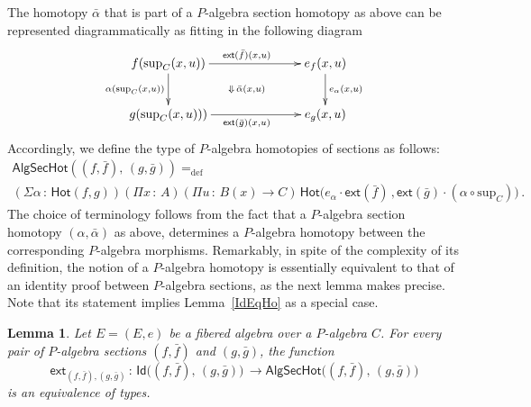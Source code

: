\documentclass[10pt,a4paper,oneside,reqno]{amsart}
\numberwithin{equation}{section}
\theoremstyle{mythm}
\newtheorem{lemma}[theorem]{Lemma}
\theoremstyle{mydef}
\theoremstyle{myrmk}
\newcommand{\defeq}{=_{\mathrm{def}}}
\newcommand{\co}{\,{:}\,}
\newcommand{\ct}{\cdot}
\newcommand{\Hot}{\mathsf{Hot}}
\newcommand{\ext}{\mathsf{ext}}
\newcommand{\Id}{\mathsf{Id}}
\renewcommand{\sup}{\mathrm{sup}}
\newcommand{\AlgSecHot}{\mathsf{AlgSecHot}}
\begin{document}
The homotopy $\bar{\alpha}$ that is part of a $P$-algebra section homotopy as above  can be
represented diagrammatically as fitting in the following diagram
\[
\xymatrix@C=2.5cm{
f ( \sup_C(x,u)) \ar[d]_{\alpha( \sup_C(x,u))} \ar[r]^{\ext(\bar{f})(x,u)}  
\ar@{}[dr]|{\Downarrow \, \bar{\alpha}(x,u)}  & e_f(x,u)  \ar[d]^{e_\alpha(x,u)} \\ 
g(\sup_C(x,u)) ) \ar[r]_{\ext(\bar{g})(x,u)} & e_g(x,u)}
\]
Accordingly, we define the type of $P$-algebra homotopies of sections as follows:
\begin{multline*} 
\AlgSecHot( (f, \bar{f}) ,\, (g, \bar{g}) )  \defeq  \\ 
(\Sigma \alpha \co \Hot( f , g)) 
(\Pi x \co A) 
(\Pi u \co B(x) \to C) \, 
\Hot\big(  e_\alpha \ct \ext( \bar{f}) \, , 
 \ext( \bar{g}) \ct (\alpha \circ \sup_C)   \big) \, .
\end{multline*}
The choice of terminology follows from the fact that  a 
$P$-algebra section homotopy $(\alpha, \bar{\alpha})$ as above, 
determines a $P$-algebra homotopy  between the corresponding $P$-algebra morphisms.
Remarkably, in spite of the complexity of its definition, the notion of a $P$-algebra homotopy is essentially equivalent to
that of an identity proof between $P$-algebra sections, as the next lemma makes precise.
Note that its statement implies Lemma~\ref{IdEqHo} as a special case.



\begin{lemma}\label{lem:fibhomeqid} Let $E = (E, e)$ be a fibered algebra over a $P$-algebra $C$.
For every pair of $P$-algebra sections $(f, \bar{f})$ and $(g, \bar{g})$,  the function
\[
\ext_{(f, \bar{f}), (g, \bar{g})} \co \Id \big( (f, \bar{f}) ,\, (g, \bar{g}) \big) \, \to
\AlgSecHot\big( (f, \bar{f}) ,\, (g, \bar{g}) \big) 
\]
is an equivalence of types.
\end{lemma}
\end{document}
